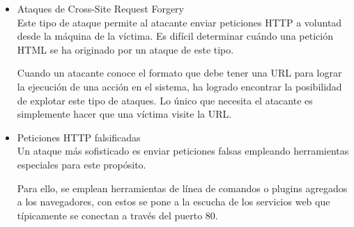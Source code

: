 \documentclass[12pt, a4paper, titlepage]{article}
\begin{document}
\begin{itemize}
		\item Ataques de Cross-Site Request Forgery \\
		Este tipo de ataque permite al atacante enviar peticiones HTTP a voluntad desde la máquina de la víctima. Es difícil determinar cuándo una petición HTML se ha originado por un ataque de este tipo.

        Cuando un atacante conoce el formato que debe tener una URL para lograr la ejecución de una acción en el sistema, ha logrado encontrar la posibilidad de explotar este tipo de ataques. Lo único que necesita el atacante es simplemente hacer que una víctima visite la URL.
		
		\item Peticiones HTTP falsificadas\\
		Un ataque más sofisticado es enviar peticiones falsas empleando herramientas especiales para este propósito.

        Para ello, se emplean herramientas de línea de comandos o plugins agregados a los navegadores, con estos se pone a la escucha de los servicios web que típicamente se conectan a través del puerto 80.
		\end{itemize}
		
\end{document}
